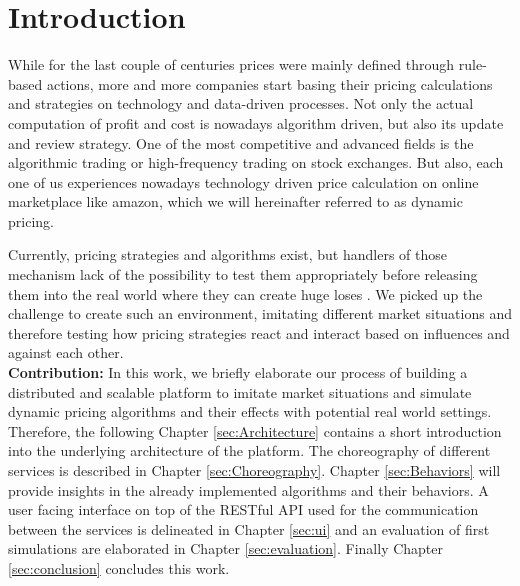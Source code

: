 %
\section{Introduction}
\label{sec:Introduction}
%
While for the last couple of centuries prices were mainly defined through rule-based actions, more and more companies start basing their pricing calculations and strategies on technology and data-driven processes. Not only the actual computation of profit and cost is nowadays algorithm driven, but also its update and review strategy.
One of the most competitive and advanced fields is the algorithmic trading or high-frequency trading on stock exchanges. But also, each one of us experiences nowadays technology driven price calculation on online marketplace like amazon, which we will hereinafter referred to as dynamic pricing. 

Currently, pricing strategies and algorithms exist, but handlers of those mechanism lack of the possibility to test them appropriately before releasing them into the real world where they can create huge loses \citep{uflacker2016ertragsmanagement} \citep{schlosser2016optimal} \citep{schlosser2016stochastic} \citep{schlosser2016survive}. We picked up the challenge to create such an environment, imitating different market situations and therefore testing how pricing strategies react and interact based on influences and against each other.\\

\textbf{Contribution:} In this work, we briefly elaborate our process of building a distributed and scalable platform to imitate market situations and simulate dynamic pricing algorithms and their effects with potential real world settings.
Therefore, the following Chapter \ref{sec:Architecture} contains a short introduction into the underlying architecture of the platform.
The choreography of different services is described in Chapter \ref{sec:Choreography}. Chapter \ref{sec:Behaviors} will provide insights in the already implemented algorithms and their behaviors.
A user facing interface on top of the RESTful API used for the communication between the services is delineated in Chapter \ref{sec:ui} and an evaluation of first simulations are elaborated in Chapter \ref{sec:evaluation}. Finally Chapter \ref{sec:conclusion} concludes this work. \\

%
%


